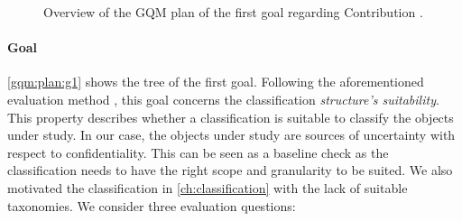 \newcommand{\textGi}[0]{Validate the classification \emph{structure's suitability}, whether it permits the appropriate classification of objects under study with the right scope and granularity.}
\newcommand{\textGiQi}[0]{Has the classification an appropriate level of \emph{generality} and granularity?}
\newcommand{\textGiQii}[0]{Is the classification \emph{appropriate}, comprising only necessary classes?}
\newcommand{\textGiQiii}[0]{Is the classification \emph{orthogonal} without overlapping classes?}
\newcommand{\textGiQiMi}[0]{{\emph{laconicity}}(C,\mathcal{R}) = \frac{\sum\nolimits_{R\in \mathcal{R}} \sum\nolimits_{r\in R} \text{laconic}(C,R,r)}{\sum\nolimits_{R\in \mathcal{R}} \lvert R \rvert} \in [0,1]}
\newcommand{\textGiQiMii}[0]{{\emph{lucidity}}(C,\mathcal{R}) = \frac{\sum\nolimits_{c\in C}\,(\min\nolimits_{R\in\mathcal{R}}\,\text{lucid}(C,R,c))}{\lvert C \rvert} \in [0,1]}
\newcommand{\textGiQiiMi}[0]{{\emph{completeness}}(C,\mathcal{R}) = \frac{\sum\nolimits_{R\in \mathcal{R}} \sum\nolimits_{r\in R} \text{complete}(C,R,r)}{\sum\nolimits_{R\in \mathcal{R}} \lvert R\rvert} \in [0,1]}
\newcommand{\textGiQiiMii}[0]{{\emph{soundness}}(C,\mathcal{R}) = \frac{\sum\nolimits_{c\in C}\,(\max\nolimits_{R\in\mathcal{R}}\,\text{sound}(C,R,c))}{\lvert C\rvert} \in [0,1]}
\newcommand{\textGiQiiiMi}[0]{$\emph{orthogonality}(C,\mathcal{R}) \in [0, 1]$, using an orthogonality matrix}
\begin{figure}
    \centering
    \caption{Overview of the \ac*{GQM} plan of the first goal regarding Contribution .}
    \label{gqm:plan:g1}
\end{figure}

\paragraph{Goal }\label{gqm:text:g:1}
\autoref{gqm:plan:g1} shows the tree of the first goal.
Following the aforementioned evaluation method \cite{kaplan_introducing_2022}, this goal concerns the classification \emph{structure's suitability}.
This property describes whether a classification is suitable to classify the objects under study.
In our case, the objects under study are sources of uncertainty with respect to confidentiality.
This can be seen as a baseline check as the classification needs to have the right scope and granularity to be suited.
We also motivated the classification in \autoref{ch:classification} with the lack of suitable taxonomies.
We consider three evaluation questions:

